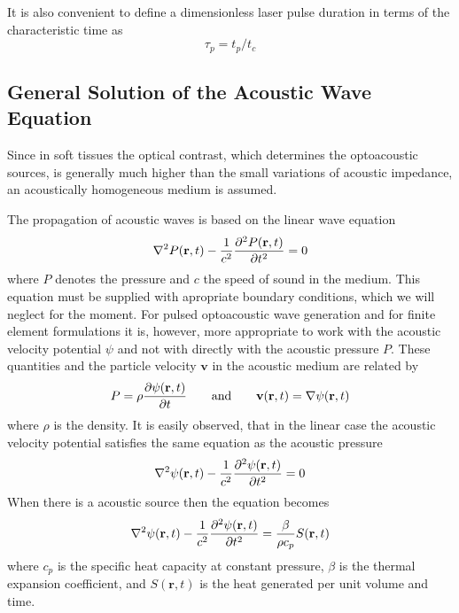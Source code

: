 \documentclass{article}
\begin{document}
It is also convenient to define a dimensionless laser pulse duration in terms of
the characteristic time as
$$
\tau_p = t_p/t_c
$$


\subsection{General Solution of the Acoustic Wave Equation}
Since in soft tissues the optical contrast, which determines the optoacoustic sources, is generally 
much higher than the small variations of acoustic impedance, 
an acoustically homogeneous medium is assumed. 

The propagation of acoustic waves is based on the linear wave equation
$$
\nabla^2 P(\mathbf{r},t) - {1\over c^2} {\partial^2 P(\mathbf{r},t) \over \partial t^2} = 0
$$
where $P$ denotes the pressure and $c$ the speed of sound in the medium.
This equation must be supplied with apropriate boundary conditions,
which we will neglect for the moment. For pulsed optoacoustic wave
generation and for finite element formulations it
is, however, more appropriate to work with the acoustic velocity
potential $\psi$ and not with directly with the acoustic pressure $P$. These quantities and
the particle velocity $\mathbf{v}$ in the acoustic medium are related by
$$
P = \rho {\partial \psi(\mathbf{r},t)\over\partial t} \qquad \mathrm{and}\qquad \mathbf{v}(\mathbf{r},t)=\nabla \psi(\mathbf{r},t)
$$
where $\rho$ is the density.  It is easily observed, that in the linear case the acoustic velocity
potential satisfies the same equation as the acoustic pressure
$$
\nabla^2\psi(\mathbf{r},t) - {1\over c^2} {\partial^2 \psi(\mathbf{r},t) \over \partial t^2} = 0
$$
When there is a acoustic source then the equation becomes
$$
\nabla^2\psi(\mathbf{r},t) - {1\over c^2} {\partial^2 \psi(\mathbf{r},t) \over \partial t^2} = {\beta\over \rho c_p} S(\mathbf{r},t)
$$
where $c_p$ is the specific heat
capacity at constant pressure, $\beta$ is the thermal expansion
coefficient, and $S(\mathbf{r},t)$ is the heat generated per unit volume
and time.  
\end{document}
